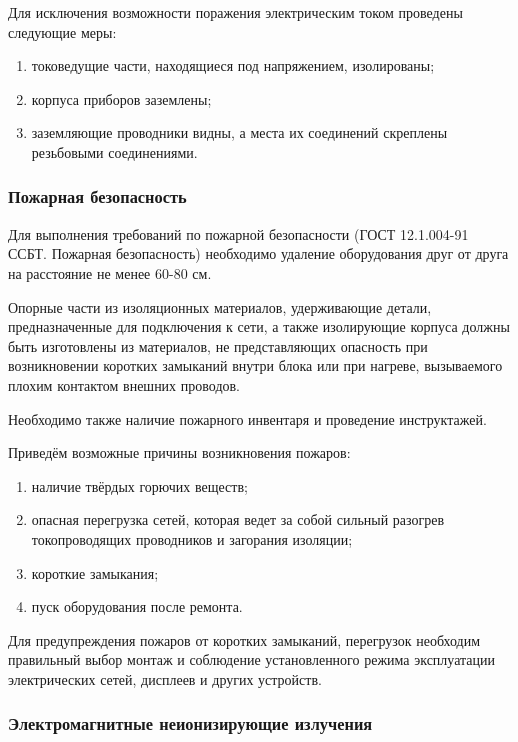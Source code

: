 Для исключения возможности поражения электрическим током проведены следующие меры:

\begin{enumerate}
\item токоведущие части, находящиеся под напряжением, изолированы;
\item корпуса приборов заземлены;
\item заземляющие проводники видны, а места их соединений скреплены резьбовыми соединениями.
\end{enumerate}
\subsubsection{Пожарная безопасность}

Для выполнения требований по пожарной безопасности (ГОСТ 12.1.004-91 ССБТ. Пожарная безопасность)\cite{OT4} необходимо удаление оборудования друг от друга на расстояние не менее 60-80 см.

Опорные части из изоляционных материалов, удерживающие детали, предназначенные для подключения к сети, а также изолирующие корпуса должны быть изготовлены из материалов, не представляющих опасность при возникновении коротких замыканий внутри блока или при нагреве, вызываемого плохим контактом внешних проводов.

Необходимо также наличие пожарного инвентаря и проведение инструктажей.

Приведём возможные причины возникновения пожаров:
\begin{enumerate}
\item наличие твёрдых горючих веществ;
\item опасная перегрузка сетей, которая ведет за собой сильный разогрев токопроводящих проводников и загорания изоляции;
\item короткие замыкания;
\item пуск оборудования после ремонта.
\end{enumerate}
Для предупреждения пожаров от коротких замыканий, перегрузок необходим правильный выбор монтаж и соблюдение установленного режима эксплуатации электрических сетей, дисплеев и других устройств.

\subsubsection{Электромагнитные неионизирующие излучения}

